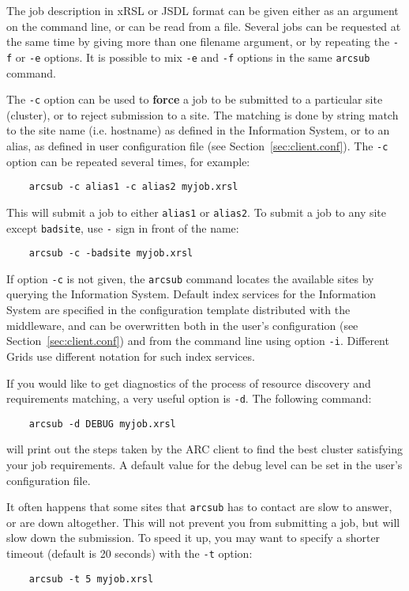 The job description in xRSL or JSDL format can be given either as an
argument on the command line, or can be read from a file. Several jobs can be
requested at the same time by giving more than one filename
argument, or by repeating the \verb#-f# or \verb#-e# options. It is
possible to mix \verb#-e# and \verb#-f# options in the same
\texttt{arcsub} command.

The \verb#-c# option can be used to \textbf{force} a job to be
submitted to a particular site (cluster), or to reject submission to a
site. The matching is done by string match to the site name (i.e.
hostname) as defined in the Information System, or to an alias, as
defined in user configuration file (see
Section~\ref{sec:client.conf}).  The \verb#-c# option can be repeated
several times, for example:
\begin{verbatim}
    arcsub -c alias1 -c alias2 myjob.xrsl
\end{verbatim}
This will submit a job to either \verb#alias1# or
\verb#alias2#. To submit a job to any site except
\verb#badsite#, use \verb#-# sign in front of the name:
\begin{verbatim}
    arcsub -c -badsite myjob.xrsl
\end{verbatim}

If option \verb#-c# is not given, the \verb#arcsub# command locates the available sites by querying the
Information System. Default index services for the Information System are specified in the
configuration template distributed with the middleware, and can be overwritten both in the user's
configuration (see Section~\ref{sec:client.conf}) and from the command line using option
\verb#-i#. Different Grids use different notation for such index services.

If you would like to get diagnostics of the process of resource
discovery and requirements matching, a very useful option is
\verb#-d#. The following command:
\begin{verbatim}
    arcsub -d DEBUG myjob.xrsl
\end{verbatim}

will print out the steps taken by the ARC client to find the
best cluster satisfying your job requirements. A default value for
the debug level can be set in the user's configuration file.

It often happens that some sites that \verb#arcsub# has to contact
are slow to answer, or are down altogether. This will not prevent
you from submitting a job, but will slow down the submission. To
speed it up, you may want to specify a shorter timeout (default is
20 seconds) with the \verb#-t# option:
\begin{verbatim}
    arcsub -t 5 myjob.xrsl
\end{verbatim}

